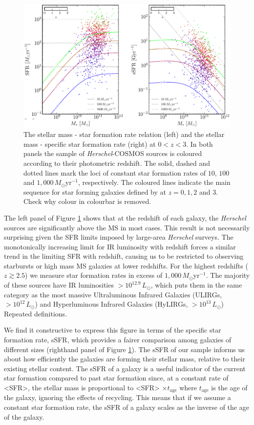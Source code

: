 \begin{figure}
	\centering
	\includegraphics[width=0.9\columnwidth]{Figures/star_formation_ms.pdf}
	\caption{The stellar mass - star formation rate relation (left) and the stellar mass - specific star formation rate (right) at $0 < z < 3$. In both panels the sample of \textit{Herschel}-COSMOS sources is coloured according to their photometric redshift. The solid, dashed and dotted lines mark the loci of constant star formation rates of $10$, $100$ and $1,000\,M_\odot$yr$^{-1}$, respectively. The coloured lines indicate the main sequence for star forming galaxies defined by \citealt{Scoville_2017} at $z = 0, 1, 2$ and $3$. {\color{red}Check why colour in colourbar is removed.}}
	\label{fig:star_formation_ms}
\end{figure}

The left panel of Figure \ref{fig:star_formation_ms} shows that at the redshift of each galaxy, the \textit{Herschel} sources are significantly above the MS in most cases. This result is not necessarily surprising given the SFR limits imposed by large-area \textit{Herschel} surveys. The monotonically increasing limit for IR luminosity with redshift forces a similar trend in the limiting SFR with redshift, causing us to be restricted to observing starbursts or high mass MS galaxies at lower redshifts. For the highest redshifts ($z \gtrsim 2.5$) we measure star formation rates in excess of $1,000\,M_\odot$yr$^{-1}$. The majority of these sources have IR luminosities $> 10^{12.9}\,L_\odot$, which puts them in the same category as the most massive Ultraluminous Infrared Galaxies (ULIRGs, $> 10^{12}\,L_\odot$) and Hyperluminous Infrared Galaxies (HyLIRGs, $> 10^{13}\,L_\odot$) {\color{red}Repeated definitions}. 

We find it constructive to express this figure in terms of the specific star formation rate, sSFR, which provides a fairer comparison among galaxies of different sizes (righthand panel of Figure \ref{fig:star_formation_ms}). The sSFR of our sample informs us about how efficiently the galaxies are forming their stellar mass, relative to their existing stellar content. The sSFR of a galaxy is a useful indicator of the current star formation compared to past star formation since, at a constant rate of <SFR>, the stellar mass is proportional to <SFR> $\times t_{\textrm{age}}$ where $t_{\textrm{age}}$ is the age of the galaxy, ignoring the effects of recycling. This means that if we assume a constant star formation rate, the sSFR of a galaxy scales as the inverse of the age of the galaxy.

